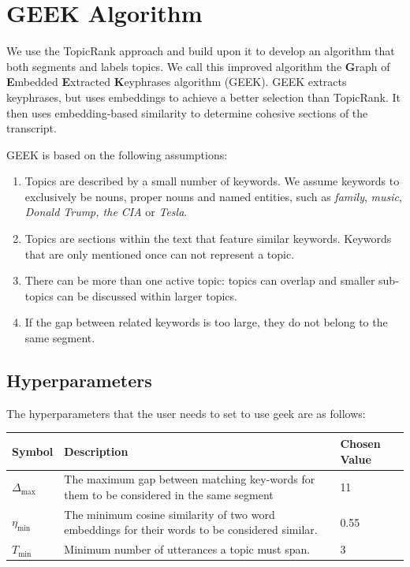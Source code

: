 \section{GEEK Algorithm}

We use the TopicRank approach and build upon it to develop an algorithm that both segments and labels topics. We call this improved algorithm the \textbf{G}raph of \textbf{E}mbedded \textbf{E}xtracted \textbf{K}eyphrases algorithm (GEEK). GEEK extracts \glspl{keyphrase}, but uses \glspl{embedding} to achieve a better selection than TopicRank. It then uses embedding-based similarity to determine cohesive sections of the transcript.

GEEK is based on the following assumptions:

\begin{enumerate}
    \item Topics are described by a small number of keywords. We assume keywords to exclusively be nouns, proper nouns and named entities, such as \textit{family}, \textit{music}, \textit{Donald Trump, the CIA} or \textit{Tesla}.
    \item Topics are sections within the text that feature similar keywords. Keywords that are only mentioned once can not represent a topic.
    \item There can be more than one active topic: topics can overlap and smaller sub-topics can be discussed within larger topics.
    \item If the gap between related keywords is too large, they do not belong to the same segment.
\end{enumerate}

    \subsection{Hyperparameters}
    The hyperparameters that the user needs to set to use \gls{geek} are as follows:

    \begin{table}[h]
        \centering
        \begin{tabularx}{0.9\textwidth}{| t | b | t |}
        \hline
        \textbf{Symbol} & \textbf{Description} & \textbf{Chosen Value} \\ \hline
        $\Delta_{\text{max}}$     & The maximum gap between matching key-words for them to be considered in the same segment & 11                    \\ \hline
        $\eta_{\text{min}}$     & The minimum cosine similarity of two word \glspl{embedding} for their words to be considered similar. & 0.55                        \\ \hline
        $T_{\text{min}}$ & Minimum number of \glspl{utterance} a topic must span. & 3 \\ \hline

        \end{tabularx}
    \end{table}

